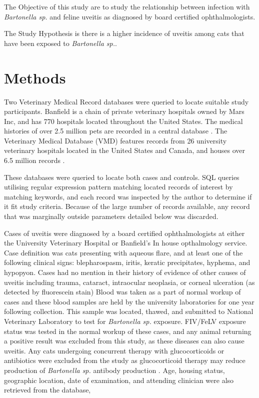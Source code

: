 \documentclass[11pt,twocolumn]{article}
\begin{document}
		\newpage

			The Objective of this study are to study the relationship between infection with \emph{Bartonella sp.} and feline uveitis as diagnosed by board certified ophthalmologists.


			The Study Hypothesis is there is a higher incidence of uveitis among cats that have been exposed to \emph{Bartonella sp.}.
\section{Methods}
	Two Veterinary Medical Record databases were queried to locate suitable study participants.
	Banfield is a chain of private veterinary hospitals owned by Mars Inc, and has 770 hospitals located throughout the United States.
	The medical histories of over 2.5 million pets are recorded in a central database \cite{bark12}.
	The Veterinary Medical Database (VMD) features records from 26 university veterinary hospitals located in the United States and Canada, and houses over 6.5 million records \cite{UniversityVeterinary}.
	

	These databases were queried to locate both cases and controls. SQL queries utilising regular expression pattern matching located records of interest by matching keywords, and each record was inspected by the author to determine if it fit study criteria. Because of the large number of records available, any record that was marginally outside parameters detailed below was discarded.


	Cases of uveitis were diagnosed by a board certified ophthalmologists at either the University Veterinary Hospital or Banfield's In house opthalmology service.
	Case definition was cats presenting with aqueous flare, and at least one of the following clinical signs: blepharospasm, iritis, keratic precipitates, hyphema, and hypopyon. 
	Cases had no mention in their history of evidence of other causes of uveitis including trauma, cataract, intraocular neoplasia, or corneal ulceration (as detected by fluorescein stain) 
	Blood was taken as a part of normal workup of cases and these blood samples are held by the university laboratories for one year following collection. This sample was located, thawed, and submitted to National Veterinary Laboratory to test for \emph{Bartonella sp.} exposure.
	FIV/FeLV exposure status was tested in the normal workup of these cases, and any animal returning a positive result was excluded from this study, as these diseases can also cause uveitis. 
	Any cats undergoing concurrent therapy with glucocorticoids or antibiotics were excluded from the study as glucocorticoid therapy may reduce production of \emph{Bartonella sp.} antibody production \cite{Lappin2000}.
	Age, housing status, geographic location, date of examination, and attending clinician  were also retrieved from the database, 
\end{document}
